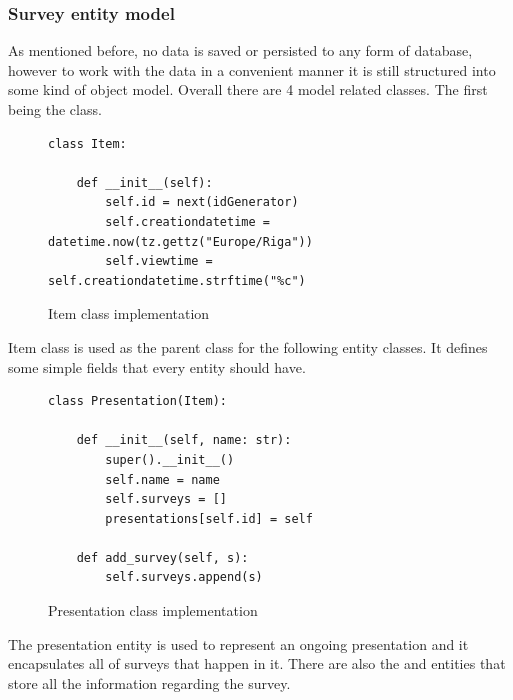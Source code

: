 \documentclass[12pt, fleqn, a4paper]{article}
\begin{document}
\subsubsection{Survey entity model}
As mentioned before, no data is saved or persisted to any form of database, however to work with the data in a convenient manner it is still structured into some kind of object model. Overall there are 4 model related classes. The first being the  class.
\begin{figure}[H]
	\centering
	\begin{verbatim} 
class Item:

    def __init__(self):
        self.id = next(idGenerator)
        self.creationdatetime = datetime.now(tz.gettz("Europe/Riga"))
        self.viewtime = self.creationdatetime.strftime("%c")
	\end{verbatim}
	\caption{Item class implementation}
\end{figure}
Item class is used as the parent class for the following entity classes. It defines some simple fields that every entity should have.
\begin{figure}[H]
	\centering
	\begin{verbatim} 
class Presentation(Item):

    def __init__(self, name: str):
        super().__init__()
        self.name = name
        self.surveys = []
        presentations[self.id] = self

    def add_survey(self, s):
        self.surveys.append(s)
	\end{verbatim}
	\caption{Presentation class implementation}
\end{figure}
The presentation entity is used to represent an ongoing presentation and it encapsulates all of surveys that happen in it. There are also the  and  entities that store all the information regarding the survey.
\end{document}
